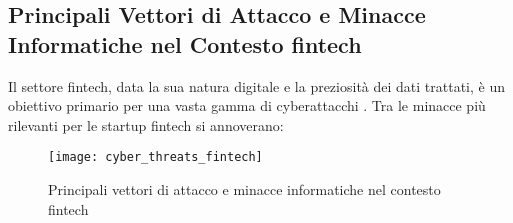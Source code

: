 \subsection{Principali Vettori di Attacco e Minacce Informatiche nel Contesto fintech}

Il settore fintech, data la sua natura digitale e la preziosità dei dati trattati, è un obiettivo primario per una vasta gamma di cyberattacchi \cite{cyberThreatsfintech}. Tra le minacce più rilevanti per le startup fintech si annoverano:

\begin{figure}[htbp]
    \centering
    \texttt{[image: cyber\_threats\_fintech]}
    \caption{Principali vettori di attacco e minacce informatiche nel contesto fintech}
    \label{fig:cyber_threats}
\end{figure}

